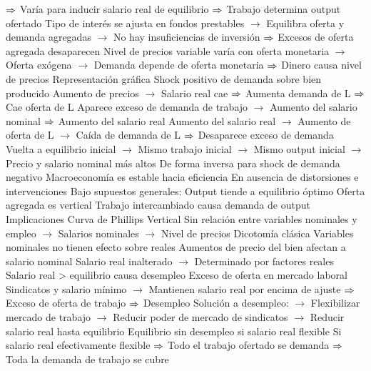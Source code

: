 \documentclass{nuevotema}
\begin{document}
\begin{esquemal}
				\4[] $\then$ Varía para inducir salario real de equilibrio
				\4[] $\then$ Trabajo determina output ofertado
				\4[] Tipo de interés se ajusta en fondos prestables
				\4[] $\to$ Equilibra oferta y demanda agregadas
				\4[] $\to$ No hay insuficiencias de inversión
				\4[] $\then$ Excesos de oferta agregada desaparecen
				\4[] Nivel de precios variable varía con oferta monetaria
				\4[] $\to$ Oferta exógena
				\4[] $\to$ Demanda depende de oferta monetaria
				\4[] $\then$ Dinero causa nivel de precios
				\4 Representación gráfica
				\4[] 
				\4 Shock positivo de demanda sobre bien producido
				\4[] Aumento de precios
				\4[] $\to$ Salario real cae
				\4[] $\then$ Aumenta demanda de L
				\4[] $\then$ Cae oferta de L
				\4[] Aparece exceso de demanda de trabajo
				\4[] $\to$ Aumento del salario nominal
				\4[] $\then$ Aumento del salario real
				\4[] Aumento del salario real
				\4[] $\to$ Aumento de oferta de L
				\4[] $\to$ Caída de demanda de L
				\4[] $\then$ Desaparece exceso de demanda
				\4[] Vuelta a equilibrio inicial
				\4[] $\to$ Mismo trabajo inicial
				\4[] $\to$ Mismo output inicial
				\4[] $\to$ Precio y salario nominal más altos
				\4[] De forma inversa para shock de demanda negativo
				\4 Macroeconomía es estable hacia eficiencia
				\4[] En ausencia de distorsiones e intervenciones
				\4[] Bajo supuestos generales:
				\4[] Output tiende a equilibrio óptimo
				\4[] Oferta agregada es vertical
				\4[] 
				\4[$\then$] Trabajo intercambiado causa demanda de output
			\3 Implicaciones
				\4 Curva de Phillips
				\4[] Vertical
				\4[] Sin relación entre variables nominales y empleo
				\4[] $\to$ Salarios nominales
				\4[] $\to$ Nivel de precios
				\4 Dicotomía clásica
				\4[] Variables nominales no tienen efecto sobre reales
				\4[] Aumentos de precio del bien afectan a salario nominal
				\4[] Salario real inalterado
				\4[] $\to$ Determinado por factores reales
				\4 Salario real > equilibrio causa desempleo
				\4[] Exceso de oferta en mercado laboral
				\4[] Sindicatos y salario mínimo
				\4[] $\to$ Mantienen salario real por encima de ajuste
				\4[] $\then$ Exceso de oferta de trabajo
				\4[] $\then$ Desempleo
				\4[] Solución a desempleo:
				\4[] $\to$ Flexibilizar mercado de trabajo
				\4[] $\to$ Reducir poder de mercado de sindicatos
				\4[] $\to$ Reducir salario real hasta equilibrio
				\4 Equilibrio sin desempleo si salario real flexible
				\4[] Si salario real efectivamente flexible
				\4[] $\then$ Todo el trabajo ofertado se demanda
				\4[] $\then$ Toda la demanda de trabajo se cubre

\end{esquemal}
\end{document}
